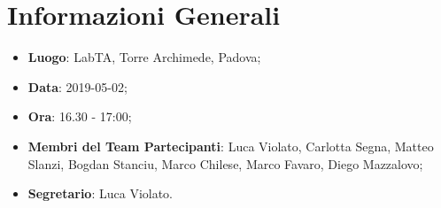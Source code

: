 \section{Informazioni Generali}
\begin{itemize}
	\item \textbf{Luogo}: LabTA, Torre Archimede, Padova; 
	\item \textbf{Data}: 2019-05-02;
	\item \textbf{Ora}: 16.30 - 17:00;
	\item \textbf{Membri del Team Partecipanti}: Luca Violato, Carlotta Segna, Matteo Slanzi, Bogdan Stanciu, Marco Chilese, Marco Favaro, Diego Mazzalovo; 
	\item \textbf{Segretario}: Luca Violato. 
\end{itemize}


